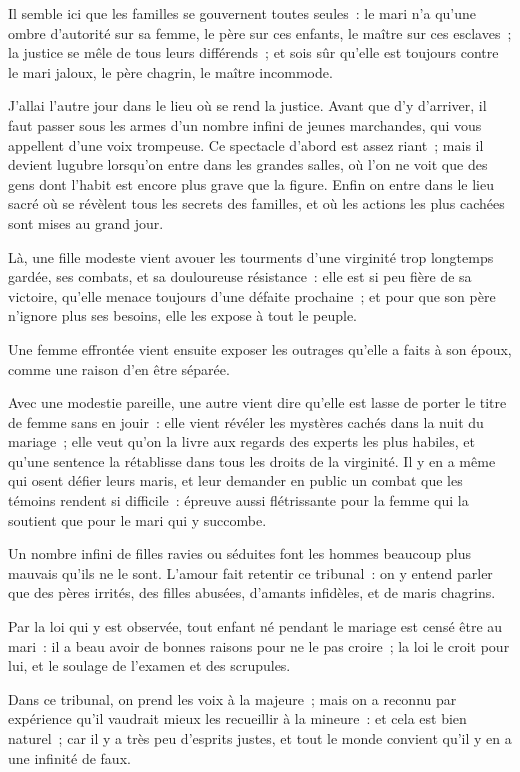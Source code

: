 \documentclass[french,twoside]{book} %
\begin{document}
\noindent Il semble ici que les familles se gouvernent toutes seules : le mari n’a qu’une ombre d’autorité sur sa femme, le père sur ces enfants, le maître sur ces esclaves ; la justice se mêle de tous leurs différends ; et sois sûr qu’elle est toujours contre le mari jaloux, le père chagrin, le maître incommode.\par
J’allai l’autre jour dans le lieu où se rend la justice. Avant que d’y d’arriver, il faut passer sous les armes d’un nombre infini de jeunes marchandes, qui vous appellent d’une voix trompeuse. Ce spectacle d’abord est assez riant ; mais il devient lugubre lorsqu’on entre dans les grandes salles, où l’on ne voit que des gens dont l’habit est encore plus grave que la figure. Enfin on entre dans le lieu sacré où se révèlent tous les secrets des familles, et où les actions les plus cachées sont mises au grand jour.\par
Là, une fille modeste vient avouer les tourments d’une virginité trop longtemps gardée, ses combats, et sa douloureuse résistance : elle est si peu fière de sa victoire, qu’elle menace toujours d’une défaite prochaine ; et pour que son père n’ignore plus ses besoins, elle les expose à tout le peuple.\par
Une femme effrontée vient ensuite exposer les outrages qu’elle a faits à son époux, comme une raison d’en être séparée.\par
Avec une modestie pareille, une autre vient dire qu’elle est lasse de porter le titre de femme sans en jouir : elle vient révéler les mystères cachés dans la nuit du mariage ; elle veut qu’on la livre aux regards des experts les plus habiles, et qu’une sentence la rétablisse dans tous les droits de la virginité. Il y en a même qui osent défier leurs maris, et leur demander en public un combat que les témoins rendent si difficile : épreuve aussi flétrissante pour la femme qui la soutient que pour le mari qui y succombe.\par
Un nombre infini de filles ravies ou séduites font les hommes beaucoup plus mauvais qu’ils ne le sont. L’amour fait retentir ce tribunal : on y entend parler que des pères irrités, des filles abusées, d’amants infidèles, et de maris chagrins.\par
Par la loi qui y est observée, tout enfant né pendant le mariage est censé être au mari : il a beau avoir de bonnes raisons pour ne le pas croire ; la loi le croit pour lui, et le soulage de l’examen et des scrupules.\par
Dans ce tribunal, on prend les voix à la majeure ; mais on a reconnu par expérience qu’il vaudrait mieux les recueillir à la mineure : et cela est bien naturel ; car il y a très peu d’esprits justes, et tout le monde convient qu’il y en a une infinité de faux.\par
\end{document}
